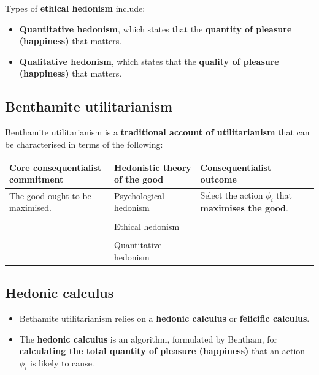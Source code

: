 \documentclass[11pt]{article}
\begin{document}
Types of \textbf{ethical hedonism} include:
\begin{itemize}
\item \textbf{Quantitative hedonism}, which states that the \textbf{quantity of pleasure (happiness)} that matters.
\item \textbf{Qualitative hedonism}, which states that the \textbf{quality of pleasure (happiness)} that matters.
\end{itemize}
\subsection{Benthamite utilitarianism}
\label{sec:org5d6aae4}
Benthamite utilitarianism is a \textbf{traditional account of utilitarianism} that can be characterised in terms of the following:
\begin{center}
\begin{tabularx}{\textwidth}{|X|X|X|}
\hline
Core consequentialist commitment & Hedonistic theory of the good & Consequentialist outcome\\
\hline
The good ought to be maximised. & Psychological hedonism & Select the action \(\phi_i\) that \textbf{maximises the good}.\\
 &  & \\
 & Ethical hedonism & \\
 &  & \\
 & Quantitative hedonism & \\
\hline
\end{tabularx}
\end{center}
\subsection{Hedonic calculus}
\label{sec:orgaeb05b4}
\begin{itemize}
\item Bethamite utilitarianism relies on a \textbf{hedonic calculus} or \textbf{felicific calculus}.
\item The \textbf{hedonic calculus} is an algorithm, formulated by Bentham, for \textbf{calculating the total quantity of pleasure (happiness)} that an action \(\phi_i\) is likely to cause.
\end{itemize}
\end{document}
